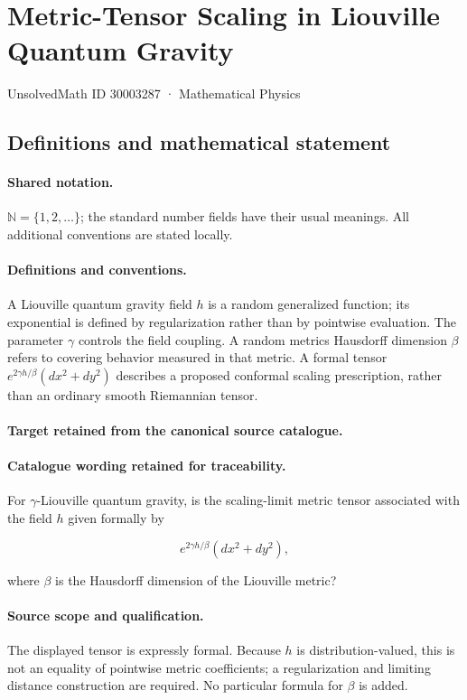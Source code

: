 \documentclass[11pt]{article}
\begin{document}
\setcounter{section}{30003286}
\section{Metric-Tensor Scaling in Liouville Quantum Gravity}\label{30003287}
{\small UnsolvedMath ID 30003287 · Mathematical Physics}
\subsection{Definitions and mathematical statement}

\paragraph{Shared notation.}$\mathbb N=\{1,2,\ldots\}$; the standard number fields have their usual meanings. All additional conventions are stated locally.


\paragraph{Definitions and conventions.}
A Liouville quantum gravity field $h$ is a random generalized function; its exponential is defined by regularization rather than by pointwise evaluation. The parameter $\gamma$ controls the field coupling. A random metric\textquotesingle s Hausdorff dimension $\beta$ refers to covering behavior measured in that metric. A formal tensor $e^{2\gamma h/\beta}(dx^2+dy^2)$ describes a proposed conformal scaling prescription, rather than an ordinary smooth Riemannian tensor.

\paragraph{Target retained from the canonical source catalogue.}
\paragraph{Catalogue wording retained for traceability.}
For $\gamma$-Liouville quantum gravity, is the scaling-limit metric tensor associated with the field $h$ given formally by

$$e^{2\gamma h/\beta}(dx^2+dy^2),$$

where $\beta$ is the Hausdorff dimension of the Liouville metric?

\paragraph{Source scope and qualification.}
The displayed tensor is expressly formal. Because $h$ is distribution-valued, this is not an equality of pointwise metric coefficients; a regularization and limiting distance construction are required. No particular formula for $\beta$ is added.
\end{document}

